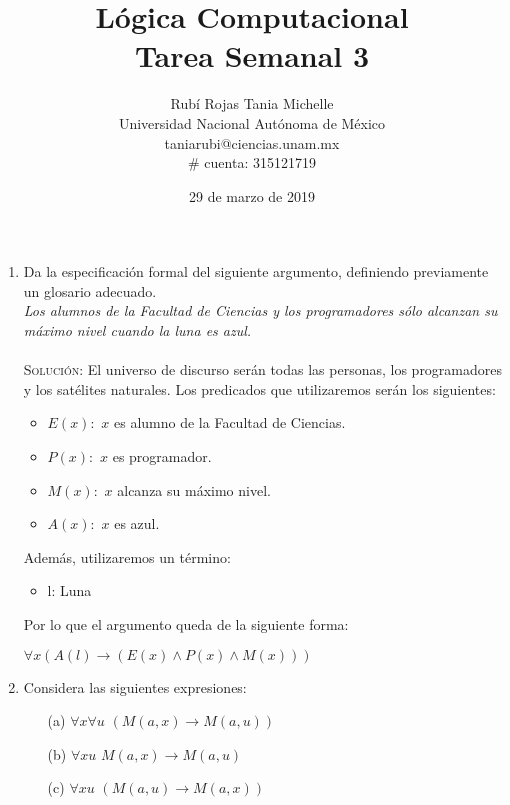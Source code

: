 \documentclass[letterpaper,11pt]{article}
\title{Lógica Computacional \\ Tarea Semanal 3}
\author{Rubí Rojas Tania Michelle \\
        Universidad Nacional Autónoma de México \\
        taniarubi@ciencias.unam.mx \\
        \# cuenta: 315121719}
\date{29 de marzo de 2019}
\begin{document}
    \maketitle

    \begin{enumerate}
        \item Da la especificación formal del siguiente argumento, definiendo
        previamente un glosario adecuado. \\
        \textit{Los alumnos de la Facultad de Ciencias y los programadores 
        sólo alcanzan su máximo nivel cuando la luna es azul.} \\  \\
        \textsc{Solución:} El universo de discurso serán todas las personas,
        los programadores y los satélites naturales. Los predicados que 
        utilizaremos serán los siguientes:
        
        \begin{itemize}
            \item $E(x):$ $x$ es alumno de la Facultad de Ciencias.
            \item $P(x):$ $x$ es programador.
            \item $M(x):$ $x$ alcanza su máximo nivel.
            \item $A(x):$ $x$ es azul.
        \end{itemize}

        Además, utilizaremos un término:
        
        \begin{itemize}
            \item l: Luna
        \end{itemize}

        Por lo que el argumento queda de la siguiente forma:
        
        \begin{center}
            $\forall x(A(l) \rightarrow (E(x) \land P(x) \land 
            M(x)))$
        \end{center}

        \item Considera las siguientes expresiones:
        
        \begin{itemize}
            \item[(a)] $\forall x \forall u$ $(M(a,x) \rightarrow M(a,u))$
            \item[(b)] $\forall xu$ $M(a,x) \rightarrow M(a,u)$
            \item[(c)] $\forall xu$ $(M(a,u) \rightarrow M(a,x))$  


\end{itemize}
\end{enumerate}
\end{document}
